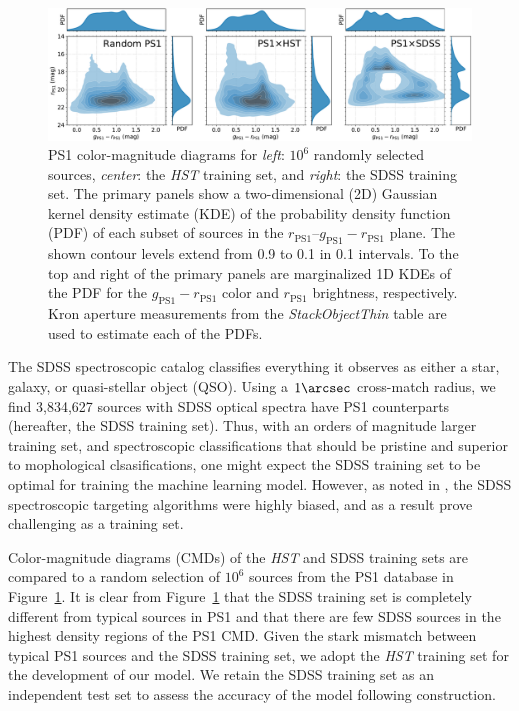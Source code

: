 \documentclass[twocolumn]{aastex62}
\begin{document}
\begin{figure}[htb]
 \centering
  \includegraphics[width=7.2in]{./Figures/ColorMagDiagram.pdf}
  \caption{ PS1 color-magnitude diagrams for \textit{left}: $10^6$ randomly
  selected sources, \textit{center}: the \textit{HST} training set, and
  \textit{right}: the SDSS training set. The primary panels show a
  two-dimensional (2D) Gaussian kernel density estimate (KDE) of the
  probability density function (PDF) of each subset of sources in the
  $r_\mathrm{PS1}$--$g_\mathrm{PS1} - r_\mathrm{PS1}$ plane. The shown
  contour levels extend from 0.9 to 0.1 in 0.1 intervals. To the top and
  right of the primary panels are marginalized 1D KDEs of the PDF for the
  $g_\mathrm{PS1} - r_\mathrm{PS1}$ color and $r_\mathrm{PS1}$ brightness,
  respectively. Kron aperture measurements from the \textit{StackObjectThin}
  table are used to estimate each of the PDFs. }
  \label{fig:cmd}
\end{figure}

The SDSS spectroscopic catalog classifies everything it observes as either a
star, galaxy, or quasi-stellar object (QSO). Using a $1\arcsec$ cross-match
radius, we find 3,834,627 sources with SDSS optical spectra have PS1
counterparts (hereafter, the SDSS training set). Thus, with an orders of
magnitude larger training set, and spectroscopic classifications that should
be pristine and superior to mophological clsasifications, one might expect
the SDSS training set to be optimal for training the machine learning model.
However, as noted in \citep{Miller17}, the SDSS spectroscopic targeting
algorithms were highly biased, and as a result prove challenging as a
training set.

Color-magnitude diagrams (CMDs) of the \textit{HST} and SDSS training sets
are compared to a random selection of $10^6$ sources from the PS1 database in
Figure~\ref{fig:cmd}. It is clear from Figure~\ref{fig:cmd} that the SDSS
training set is completely different from typical sources in PS1 and that
there are few SDSS sources in the highest density regions of the PS1 CMD.
Given the stark mismatch between typical PS1 sources and the SDSS training
set, we adopt the \textit{HST} training set for the development of our model.
We retain the SDSS training set as an independent test set to assess the
accuracy of the model following construction.
\end{document}
